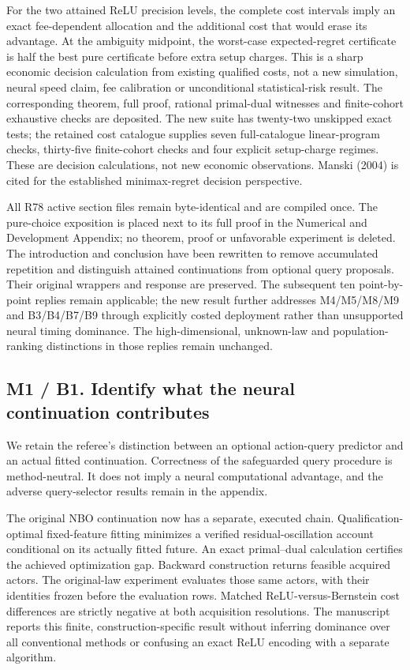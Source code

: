 \documentclass[ecta,nameyear,draft]{econsocart}
\begin{document}
For the two attained ReLU precision levels, the complete cost intervals
imply an exact fee-dependent allocation and the additional cost that
would erase its advantage. At the ambiguity midpoint, the worst-case
expected-regret certificate is half the best pure certificate before
extra setup charges. This is a sharp economic decision calculation from
existing qualified costs, not a new simulation, neural speed claim, fee
calibration or unconditional statistical-risk result. The corresponding
theorem, full proof, rational primal-dual witnesses and finite-cohort
exhaustive checks are deposited. The new suite has twenty-two unskipped
exact tests; the retained cost catalogue supplies seven full-catalogue
linear-program checks, thirty-five finite-cohort checks and four
explicit setup-charge regimes. These are decision calculations, not new
economic observations. Manski (2004) is cited for the established
minimax-regret decision perspective.

All R78 active section files remain byte-identical and are compiled
once. The pure-choice exposition is placed next to its full proof in the
Numerical and Development Appendix; no theorem, proof or unfavorable
experiment is deleted. The introduction and conclusion have been
rewritten to remove accumulated repetition and distinguish attained
continuations from optional query proposals. Their original wrappers and
response are preserved. The subsequent ten point-by-point replies remain
applicable; the new result further addresses M4/M5/M8/M9 and B3/B4/B7/B9
through explicitly costed deployment rather than unsupported neural
timing dominance. The high-dimensional, unknown-law and
population-ranking distinctions in those replies remain unchanged.

\hypertarget{m1-b1.-identify-what-the-neural-continuation-contributes}{%
\subsection{M1 / B1. Identify what the neural continuation
contributes}\label{m1-b1.-identify-what-the-neural-continuation-contributes}}

We retain the referee's distinction between an optional action-query
predictor and an actual fitted continuation. Correctness of the
safeguarded query procedure is method-neutral. It does not imply a
neural computational advantage, and the adverse query-selector results
remain in the appendix.

The original NBO continuation now has a separate, executed chain.
Qualification-optimal fixed-feature fitting minimizes a verified
residual-oscillation account conditional on its actually fitted future.
An exact primal--dual calculation certifies the achieved optimization
gap. Backward construction returns feasible acquired actors. The
original-law experiment evaluates those same actors, with their
identities frozen before the evaluation rows. Matched
ReLU-versus-Bernstein cost differences are strictly negative at both
acquisition resolutions. The manuscript reports this finite,
construction-specific result without inferring dominance over all
conventional methods or confusing an exact ReLU encoding with a separate
algorithm.
\end{document}
